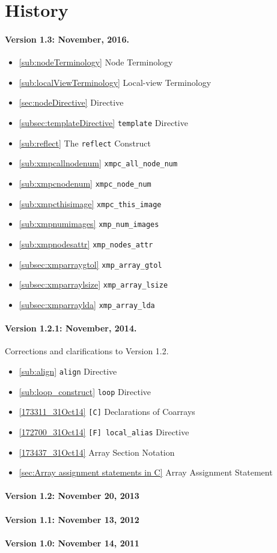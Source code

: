 \section*{History}

\paragraph*{Version 1.3: November, 2016.}

\begin{itemize}
  \item \ref{sub:nodeTerminology}      Node Terminology
  \item \ref{sub:localViewTerminology} Local-view Terminology
  \item \ref{sec:nodeDirective}         Directive
  \item \ref{subsec:templateDirective} {\tt template} Directive
  \item \ref{sub:reflect}              The {\tt reflect} Construct
  \item \ref{sub:xmpcallnodenum}       {\tt xmpc\_all\_node\_num}
  \item \ref{sub:xmpcnodenum}          {\tt xmpc\_node\_num}
  \item \ref{sub:xmpcthisimage}        {\tt xmpc\_this\_image}
  \item \ref{sub:xmpnumimages}         {\tt xmp\_num\_images}
  \item \ref{sub:xmpnodesattr}         {\tt xmp\_nodes\_attr}
  \item \ref{subsec:xmparraygtol}      {\tt xmp\_array\_gtol}
  \item \ref{subsec:xmparraylsize}     {\tt xmp\_array\_lsize}
  \item \ref{subsec:xmparraylda}       {\tt xmp\_array\_lda}
\end{itemize}


\paragraph*{Version 1.2.1: November, 2014.} Corrections and
clarifications to Version 1.2.

\begin{itemize}
  \item \ref{sub:align} {\tt align} Directive
  \item \ref{sub:loop_construct} {\tt loop} Directive
  \item \ref{173311_31Oct14} {\tt [C]} Declarations of Coarrays
  \item \ref{172700_31Oct14} {\tt [F] local\_alias} Directive
  \item \ref{173437_31Oct14} Array Section Notation
  \item \ref{sec:Array assignment statements in C} Array Assignment Statement
\end{itemize}

\paragraph*{Version 1.2: November 20, 2013}

\paragraph*{Version 1.1: November 13, 2012}

\paragraph*{Version 1.0: November 14, 2011}
